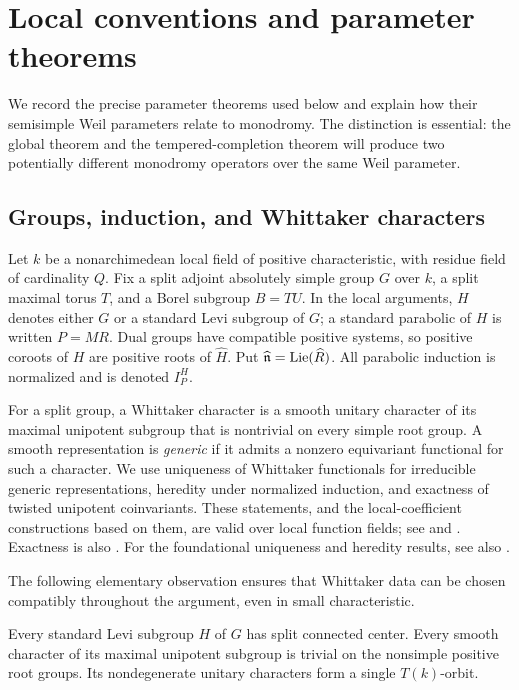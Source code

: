 \section{Local conventions and parameter theorems}\label{sec:parameters}

We record the precise parameter theorems used below and explain how their
semisimple Weil parameters relate to monodromy. The distinction is essential:
the global theorem and the tempered-completion theorem will produce two
potentially different monodromy operators over the same Weil parameter.

\subsection{Groups, induction, and Whittaker characters}

Let $k$ be a nonarchimedean local field of positive characteristic, with
residue field of cardinality $Q$. Fix a split adjoint absolutely simple
group $G$ over $k$, a split maximal torus $T$, and a Borel subgroup $B=TU$.
In the local arguments, $H$ denotes either $G$ or a standard Levi subgroup
of $G$; a standard parabolic of $H$ is written $P=MR$. Dual groups have
compatible positive systems, so positive coroots of $H$ are positive roots
of $\widehat H$. Put $\widehat{\mathfrak n}=\operatorname{Lie}(\widehat R)$.
All parabolic induction is normalized and is denoted $I_P^H$.

For a split group, a Whittaker character is a smooth unitary character of
its maximal unipotent subgroup that is nontrivial on every simple root
group. A smooth representation is \emph{generic} if it admits a nonzero
equivariant functional for such a character. We use uniqueness of Whittaker
functionals for irreducible generic representations, heredity under
normalized induction, and exactness of twisted unipotent coinvariants.
These statements, and the local-coefficient constructions based on them,
are valid over local function fields; see \cite[Sections~1--2]{LomeliLS}
and \cite[Section~2]{DCHL}. Exactness is also
\cite[Proposition~1.9(a)]{BernsteinZelevinsky}. For the foundational uniqueness and heredity
results, see also \cite[Th\'eor\`emes~2 and~4]{Rodier}.

The following elementary observation ensures that Whittaker data can be
chosen compatibly throughout the argument, even in small characteristic.

\begin{lemma}\label{lem:whittaker}
Every standard Levi subgroup $H$ of $G$ has split connected center.
Every smooth character of its maximal unipotent subgroup is trivial on
the nonsimple positive root groups. Its nondegenerate unitary characters
form a single $T(k)$-orbit.
\end{lemma}

